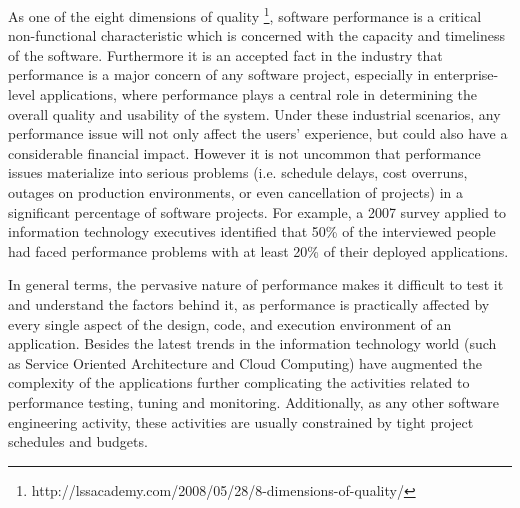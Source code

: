 \documentclass[runningheads,a4paper]{llncs}
\begin{document}
As one of the eight dimensions of quality
\footnote{http://lssacademy.com/2008/05/28/8-dimensions-of-quality/}, software
performance is a critical non-functional characteristic which is concerned
with the capacity and timeliness of the software. Furthermore it is an accepted
fact in the industry that performance is a major concern of any software
project, especially in enterprise-level applications, where performance plays a
central role in determining the overall quality and usability of the system. Under 
these industrial scenarios,  any performance issue will not only affect the
users’ experience, but could also have a considerable financial impact.
However it is not uncommon that performance issues materialize into serious
problems (i.e. schedule delays, cost overruns, outages on production
environments, or even cancellation of projects) in a significant percentage of
software projects. For example, a 2007 survey applied to information technology
executives \cite{Compuware1} identified that 50\% of the interviewed people had
faced performance problems with at least 20\% of their deployed applications.

In general terms, the pervasive nature of performance makes it difficult to
test it and understand the factors behind it, as performance is practically
affected by every single aspect of the design, code, and execution environment of an application.
Besides the latest trends in the information technology world (such as Service Oriented
Architecture and Cloud Computing) have augmented the complexity of the
applications further complicating the activities related to performance testing,
tuning and monitoring. Additionally, as any other software engineering activity,
these activities are usually constrained by tight project schedules and budgets.
\end{document}
